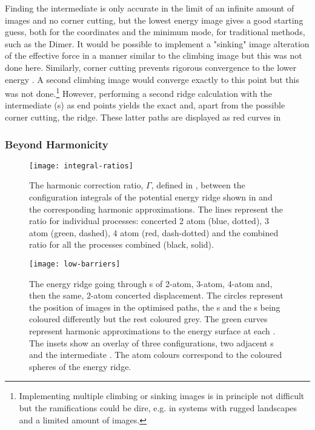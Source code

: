 Finding the intermediate  is only accurate in the limit of an infinite amount of images and no corner cutting, but the lowest energy image gives a good starting guess, both for the coordinates and the minimum mode, for traditional  methods, such as the Dimer.
It would be possible to implement a "sinking" image alteration of the effective force in a manner similar to the climbing image but this was not done here.
Similarly, corner cutting prevents rigorous convergence to the lower energy .
A second climbing image would converge exactly to this point but this was not done.\footnote{Implementing multiple climbing or sinking images is in principle not difficult but the ramifications could be dire, e.g. in systems with rugged landscapes and a limited amount of images.}
However, performing a second ridge calculation with the intermediate (s) as end points yields the exact  and, apart from the possible corner cutting, the ridge.
These latter paths are displayed as red curves in 

\subsubsection{Beyond Harmonicity}
\begin{SCfigure}[5.0][h!]
\centering
\texttt{[image: integral-ratios]}
\caption{
The harmonic correction ratio, $\Gamma$, defined in ,
between the configuration integrals of the potential energy ridge shown in  and the corresponding harmonic approximations.
The lines represent the ratio for individual processes: concerted 2 atom (blue, dotted), 3 atom (green, dashed), 4 atom (red, dash-dotted) and the combined ratio for all the processes combined (black, solid).
}
\label{fig:integral-ratios}
\end{SCfigure}

\begin{figure}[hp]
\begin{center}
\texttt{[image: low-barriers]}
    \parbox{0.85\linewidth}{
\caption{
The energy ridge going through s of 2-atom, 3-atom, 4-atom and, then the same, 2-atom concerted displacement.
The circles represent the position of images in the optimised paths, the s and the s being coloured differently but the rest coloured grey.
The green curves represent harmonic approximations to the energy surface at each .
The insets show an overlay of three configurations, two adjacent s and the intermediate .
The atom colours correspond to the coloured spheres of the energy ridge.
}
\label{fig:low-barriers}
}
\end{center}
\end{figure}


